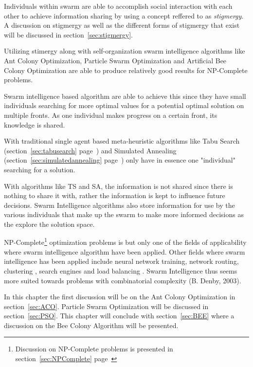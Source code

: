 Individuals within swarm are able to accomplish social interaction with each other to achieve information sharing by using a concept reffered to as \emph{stigmergy}. A discussion on stigmergy as well as the different forms of stigmergy that exist will be discussed in section~\ref{sec:stigmergy}.

Utilizing stimergy along with self-organization swarm intelligence algorithms like Ant Colony Optimization, Particle Swarm Optimization and Artificial Bee Colony Optimization are able to produce relatively good results for NP-Complete problems\cite{CompuIntelligenceIntro,FundamentalSwarm,SwarmArt}. 

Swarm intelligence based algorithm are able to achieve this since they have small individuals searching for more optimal values for a potential optimal solution on multiple fronts. As one individual makes progress on a certain front, its knowledge is shared\cite{CompuIntelligenceIntro,FundamentalSwarm}. 

With traditional single agent based meta-heuristic algorithms like Tabu Search (section~\ref{sec:tabusearch} page~\pageref{sec:tabusearch}) and Simulated Annealing (section~\ref{sec:simulatedannealing} page~\pageref{sec:simulatedannealing}) only have in essence one "individual" searching for a solution\cite{CompuIntelligenceIntro,FundamentalSwarm}. 

With algorithms like TS and SA, the information is not shared since there is nothing to share it with, rather the information is kept to influence future decisions\cite{AIModernApproach,TabuMontemanniSmith,TabuVechicleRoutingWithTimeWindows,CurveFittingSA,EcoEquilSA}. Swarm Intelligence algorithms also store information for use by the various individuals that make up the swarm to make more informed decisions as the explore the solution space\cite{CompuIntelligenceIntro,FundamentalSwarm}.

NP-Complete\footnote{Discussion on NP-Complete problems is presented in section~\ref{sec:NPComplete} page~\pageref{sec:NPComplete}} optimization problems is but only one of the fields of applicability where swarm intelligence algorithm have been applied. Other fields where swarm intelligence has been applied include neural network training, network routing, clustering\cite{AntSwarmClustering} , search engines and load balancing \cite{}. Swarm Intelligence thus seems more suited towards problems with combinatorial complexity (B. Denby, 2003).

In this chapter the first discussion will be on the Ant Colony Optimization in section~\ref{sec:ACO}. Particle Swarm Optimization will be discussed in section~\ref{sec:PSO}. This chapter will conclude with section~\ref{sec:BEE} where a discussion on the Bee Colony Algorithm will be presented. 

